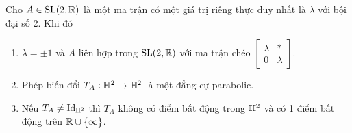 \begin{prop}\label{prop 3.1.8}
    Cho $A \in \operatorname{SL}(2,\mathbb{R})$ là một ma trận có một giá trị riêng thực duy nhất là $\lambda$ với bội đại số 2.  Khi đó
    \begin{enumerate}
        \item $\lambda  = \pm 1$ và $A$ liên hợp trong $\operatorname{SL}(2,\mathbb{R})$ với ma trận chéo $\begin{bmatrix}
            \lambda & *\\
            0 & \lambda
        \end{bmatrix}$.
        \item Phép biến đổi $T_A: \mathbb{H}^2 \to \mathbb{H}^2$ là một đẳng cự parabolic.
        \item Nếu $T_A \neq \operatorname{Id}_{\mathbb{H}^2}$ thì $T_A$ không có điểm bất động trong $\mathbb{H}^2$ và có 1 điểm bất động trên $\mathbb{R} \cup \{\infty\}$.
    \end{enumerate}
\end{prop}
